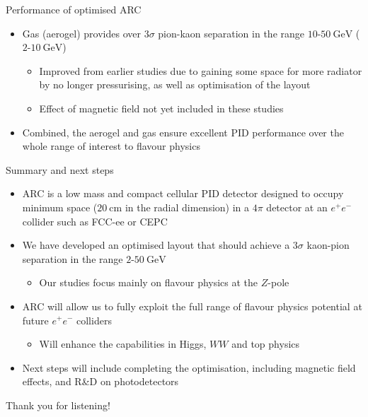 \documentclass{beamer}
\begin{document}
\begin{frame}{Performance of optimised ARC}
\begin{figure}
  \end{figure}
  \vspace{-0.4cm}
  \begin{itemize}
    \setlength\itemsep{0.0em}
    \item{Gas (aerogel) provides over $3\sigma$ pion-kaon separation in the range $10$-$\SI{50}{\giga\eV}$ ($2$-$\SI{10}{\giga\eV}$)}
    \begin{itemize}
      \item{Improved from earlier studies due to gaining some space for more radiator by no longer pressurising, as well as optimisation of the layout}
      \item{Effect of magnetic field not yet included in these studies}
    \end{itemize}
    \item{Combined, the aerogel and gas ensure excellent PID performance over the whole range of interest to flavour physics}
  \end{itemize}
\end{frame}

\begin{frame}{Summary and next steps}
  \begin{itemize}
    \setlength\itemsep{1.0em}
    \item{ARC is a low mass and compact cellular PID detector designed to occupy minimum space ($\SI{20}{\centi\meter}$ in the radial dimension) in a $4\pi$ detector at an $e^+e^-$ collider such as FCC-ee or
 CEPC}
    \item{We have developed an optimised layout that should achieve a $3\sigma$ kaon-pion separation in the range $2$-$\SI{50}{\giga\eV}$}
    \begin{itemize}
      \item{Our studies focus mainly on flavour physics at the $Z$-pole}
    \end{itemize}
    \item{ARC will allow us to fully exploit the full range of flavour physics potential at future $e^+e^-$ colliders}
    \begin{itemize}
      \item{Will enhance the capabilities in Higgs, $WW$ and top physics}
    \end{itemize}
    \item{Next steps will include completing the optimisation, including magnetic field effects, and R\&D on photodetectors}
  \end{itemize}
  \begin{center}
    \huge Thank you for listening!
  \end{center}
\end{frame}
\end{document}
